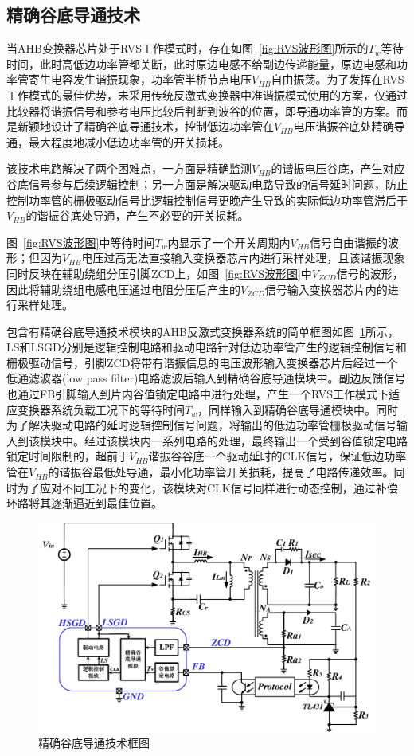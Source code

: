\subsection{精确谷底导通技术}
当AHB变换器芯片处于RVS工作模式时，存在如图~\ref{fig:RVS波形图}所示的$T_w$等待时间，此时高低边功率管都关断，此时原边电感不给副边传递能量，原边电感和功率管寄生电容发生谐振现象，功率管半桥节点电压$V_{HB}$自由振荡。为了发挥在RVS工作模式的最佳优势，未采用传统反激式变换器中准谐振模式使用的方案，仅通过比较器将谐振信号和参考电压比较后判断到波谷的位置，即导通功率管的方案。而是新颖地设计了精确谷底导通技术，控制低边功率管在$V_{HB}$电压谐振谷底处精确导通，最大程度地减小低边功率管的开关损耗。

该技术电路解决了两个困难点，一方面是精确监测$V_{HB}$的谐振电压谷底，产生对应谷底信号参与后续逻辑控制；另一方面是解决驱动电路导致的信号延时问题，防止控制功率管的栅极驱动信号比逻辑控制信号更晚产生导致的实际低边功率管滞后于$V_{HB}$的谐振谷底处导通，产生不必要的开关损耗。

图~\ref{fig:RVS波形图}中等待时间$T_w$内显示了一个开关周期内$V_{HB}$信号自由谐振的波形；但因为$V_{HB}$电压过高无法直接输入变换器芯片内进行采样处理，且该谐振现象同时反映在辅助绕组分压引脚ZCD上，如图~\ref{fig:RVS波形图}中$V_{ZCD}$信号的波形，因此将辅助绕组电感电压通过电阻分压后产生的$V_{ZCD}$信号输入变换器芯片内的进行采样处理。

包含有精确谷底导通技术模块的AHB反激式变换器系统的简单框图如图~\ref{fig:精确谷底导通技术框图}所示，LS和LSGD分别是逻辑控制电路和驱动电路针对低边功率管产生的逻辑控制信号和栅极驱动信号，引脚ZCD将带有谐振信息的电压波形输入变换器芯片后经过一个低通滤波器(low pass filter)电路滤波后输入到精确谷底导通模块中。副边反馈信号也通过FB引脚输入到片内谷值锁定电路中进行处理，产生一个RVS工作模式下适应变换器系统负载工况下的等待时间$T_w$，同样输入到精确谷底导通模块中。同时为了解决驱动电路的延时逻辑控制信号问题，将输出的低边功率管栅极驱动信号输入到该模块中。经过该模块内一系列电路的处理，最终输出一个受到谷值锁定电路锁定时间限制的，超前于$V_{HB}$谐振谷谷底一个驱动延时的CLK信号，保证低边功率管在$V_{HB}$的谐振谷最低处导通，最小化功率管开关损耗，提高了电路传递效率。同时为了应对不同工况下的变化，该模块对CLK信号同样进行动态控制，通过补偿环路将其逐渐逼近到最佳位置。



\begin{figure}[htbp] 
    \centering
    \includegraphics[width=0.8\linewidth]{figures/精确谷底导通技术框图.pdf}
    \caption{精确谷底导通技术框图}
    \label{fig:精确谷底导通技术框图}
\end{figure}



